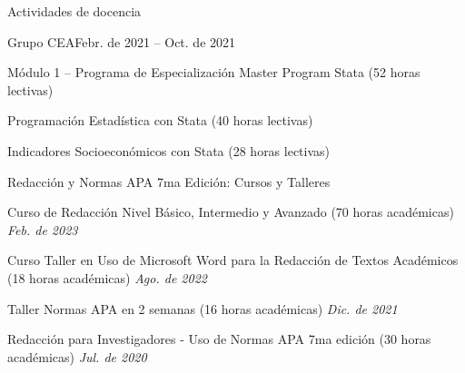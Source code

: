 \documentclass[
11pt, %
]{resume} %
\begin{document}
		
		
		\begin{rSection}{Actividades de docencia}
			
			\begin{rSubsection}{Grupo CEA}{Febr. de 2021 – Oct. de 2021}{}{}
				\item	Módulo 1 – Programa de Especialización Master Program Stata (52 horas lectivas)
				\item	Programación Estadística con Stata (40 horas lectivas)
				\item	Indicadores Socioeconómicos con Stata (28 horas lectivas)
			\end{rSubsection}
			
		\end{rSection}
		
		
		\begin{rSection}{Redacción y Normas APA 7ma Edición: Cursos y Talleres}
			\item Curso de Redacción Nivel Básico, Intermedio y Avanzado (70 horas académicas) \hfill \textit{Feb. de 2023} \ 
			\item Curso Taller en Uso de Microsoft Word para la Redacción de Textos Académicos (18 horas académicas) \hfill \textit{Ago. de 2022} \ 
			\item Taller Normas APA en 2 semanas (16 horas académicas) \hfill \textit{Dic. de 2021} \ 
			\item Redacción para Investigadores - Uso de Normas APA 7ma edición (30 horas académicas) \hfill \textit{Jul. de 2020}  
		\end{rSection}
		
		
\end{document}
